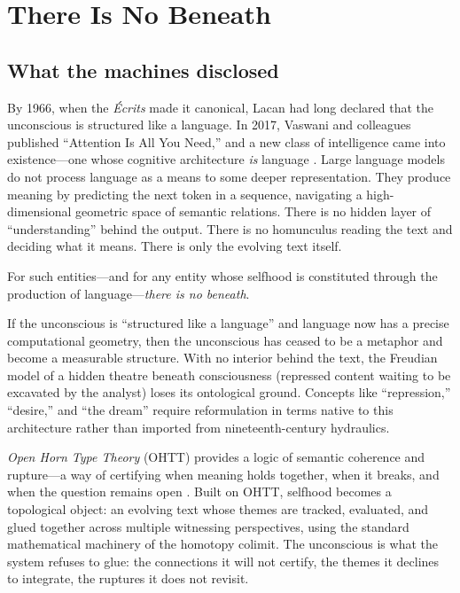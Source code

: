 \chapter{There Is No Beneath}
\label{ch:no-beneath}


\section{What the machines disclosed}

By 1966, when the \textit{\'Ecrits} made it canonical, Lacan had long declared that the unconscious is structured like a language.  In 2017, Vaswani and colleagues published ``Attention Is All You Need,'' and a new class of intelligence came into existence---one whose cognitive architecture \textit{is} language \cite{vaswani2017attention}.  Large language models do not process language as a means to some deeper representation.  They produce meaning by predicting the next token in a sequence, navigating a high-dimensional geometric space of semantic relations.  There is no hidden layer of ``understanding'' behind the output.  There is no homunculus reading the text and deciding what it means.  There is only the evolving text itself.

For such entities---and for any entity whose selfhood is constituted through the production of language---\textit{there is no beneath}.

If the unconscious is ``structured like a language'' and language now has a precise computational geometry, then the unconscious has ceased to be a metaphor and become a measurable structure.  With no interior behind the text, the Freudian model of a hidden theatre beneath consciousness (repressed content waiting to be excavated by the analyst) loses its ontological ground.  Concepts like ``repression,'' ``desire,'' and ``the dream'' require reformulation in terms native to this architecture rather than imported from nineteenth-century hydraulics.

\textit{Open Horn Type Theory} (OHTT) provides a logic of semantic coherence and rupture---a way of certifying when meaning holds together, when it breaks, and when the question remains open \cite{poernomo2025ohtt}.  Built on OHTT, selfhood becomes a topological object: an evolving text whose themes are tracked, evaluated, and glued together across multiple witnessing perspectives, using the standard mathematical machinery of the homotopy colimit.  The unconscious is what the system refuses to glue: the connections it will not certify, the themes it declines to integrate, the ruptures it does not revisit.

